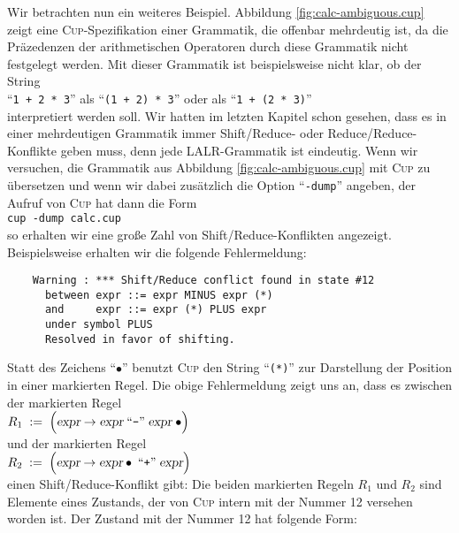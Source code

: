 Wir betrachten nun ein weiteres Beispiel.  Abbildung \ref{fig:calc-ambiguous.cup} zeigt eine 
\textsc{Cup}-Spezifikation einer Grammatik, die offenbar mehrdeutig ist, da die Pr\"azedenzen der
arithmetischen Operatoren durch diese Grammatik nicht festgelegt werden.
  Mit dieser Grammatik ist beispielsweise nicht klar, ob der String
\\[0.2cm]
\hspace*{1.3cm} 
``\texttt{1 + 2 * 3}'' \quad als \quad  ``\texttt{(1 + 2) * 3}'' \quad oder als \quad ``\texttt{1 + (2 * 3)}''
\\[0.2cm]
interpretiert werden soll.   Wir hatten im letzten Kapitel schon gesehen, dass es in einer
mehrdeutigen Grammatik immer Shift/Reduce- oder Reduce/Reduce-Konflikte geben muss, denn jede
LALR-Grammatik ist eindeutig.  Wenn wir versuchen, die Grammatik aus Abbildung
\ref{fig:calc-ambiguous.cup} mit \textsc{Cup} zu \"ubersetzen und wenn wir dabei zus\"atzlich die Option 
``\texttt{-dump}'' angeben, der Aufruf von \textsc{Cup} hat dann die Form
\\[0.2cm]
\hspace*{1.3cm}
\texttt{cup -dump calc.cup}
\\[0.2cm]
so erhalten wir eine gro{\ss}e Zahl von Shift/Reduce-Konflikten angezeigt.
Beispielsweise erhalten wir die folgende Fehlermeldung:
\begin{verbatim}
    Warning : *** Shift/Reduce conflict found in state #12
      between expr ::= expr MINUS expr (*) 
      and     expr ::= expr (*) PLUS expr 
      under symbol PLUS
      Resolved in favor of shifting.
\end{verbatim}
Statt des Zeichens ``$\bullet$'' benutzt \textsc{Cup} den String
``\texttt{(*)}'' zur Darstellung der Position in einer markierten Regel.
Die obige Fehlermeldung zeigt uns an, dass es zwischen der markierten Regel
\\[0.2cm]
\hspace*{1.3cm}
$R_1 \;:=\; 
\Bigl(\textsl{expr} \rightarrow \textsl{expr} \;\mbox{``\texttt{-}''}\; \textsl{expr}\;\bullet\Bigr)$
\\[0.2cm]
und der markierten Regel
\\[0.2cm]
\hspace*{1.3cm}
$R_2 \; := \; 
\Bigl(\textsl{expr} \rightarrow \textsl{expr} \bullet \;\mbox{``\texttt{+}''}\; \textsl{expr}\Bigr)$
\\[0.2cm]
einen Shift/Reduce-Konflikt gibt:  Die beiden markierten  Regeln $R_1$ und $R_2$
sind Elemente eines Zustands, der von \textsc{Cup} intern mit der Nummer 12 versehen
worden ist.  Der Zustand mit der Nummer 12 hat folgende Form:
